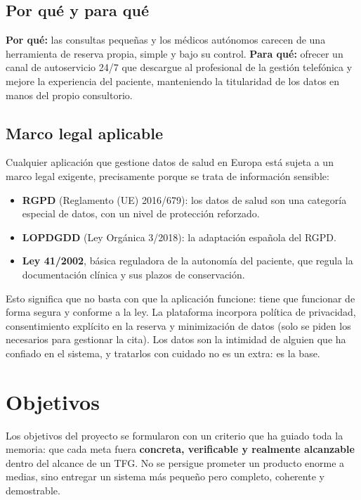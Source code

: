\documentclass[12pt,a4paper]{report}
\begin{document}
\section{Por qué y para qué}

\textbf{Por qué:} las consultas pequeñas y los médicos autónomos carecen de una herramienta de reserva propia, simple y bajo su control. \textbf{Para qué:} ofrecer un canal de autoservicio 24/7 que descargue al profesional de la gestión telefónica y mejore la experiencia del paciente, manteniendo la titularidad de los datos en manos del propio consultorio.

\section{Marco legal aplicable}

Cualquier aplicación que gestione datos de salud en Europa está sujeta a un marco legal exigente, precisamente porque se trata de información sensible:

\begin{itemize}
  \item \textbf{RGPD} (Reglamento (UE) 2016/679): los datos de salud son una categoría especial de datos, con un nivel de protección reforzado.
  \item \textbf{LOPDGDD} (Ley Orgánica 3/2018): la adaptación española del RGPD.
  \item \textbf{Ley 41/2002}, básica reguladora de la autonomía del paciente, que regula la documentación clínica y sus plazos de conservación.
\end{itemize}

Esto significa que no basta con que la aplicación funcione: tiene que funcionar de forma segura y conforme a la ley. La plataforma incorpora política de privacidad, consentimiento explícito en la reserva y minimización de datos (solo se piden los necesarios para gestionar la cita). Los datos son la intimidad de alguien que ha confiado en el sistema, y tratarlos con cuidado no es un extra: es la base.

\chapter{Objetivos}

Los objetivos del proyecto se formularon con un criterio que ha guiado toda la memoria: que cada meta fuera \textbf{concreta, verificable y realmente alcanzable} dentro del alcance de un TFG. No se persigue prometer un producto enorme a medias, sino entregar un sistema más pequeño pero completo, coherente y demostrable.
\end{document}
